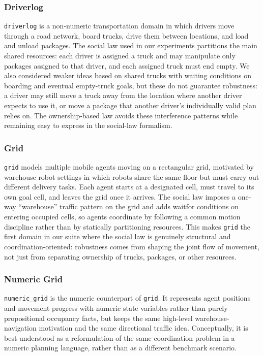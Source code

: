 \documentclass{article}
\theoremstyle{definition}
\begin{document}
\subsubsection{Driverlog}

\texttt{driverlog} is a non-numeric transportation domain in which drivers move through a road network, board trucks, drive them between locations, and load and unload packages. The social law used in our experiments partitions the main shared resources: each driver is assigned a truck and may manipulate only packages assigned to that driver, and each assigned truck must end empty. We also considered weaker ideas based on shared trucks with waiting conditions on boarding and eventual empty-truck goals, but these do not guarantee robustness: a driver may still move a truck away from the location where another driver expects to use it, or move a package that another driver's individually valid plan relies on. The ownership-based law avoids these interference patterns while remaining easy to express in the social-law formalism.

\subsubsection{Grid}

\texttt{grid} models multiple mobile agents moving on a rectangular grid, motivated by warehouse-robot settings in which robots share the same floor but must carry out different delivery tasks. Each agent starts at a designated cell, must travel to its own goal cell, and leaves the grid once it arrives. The social law imposes a one-way ``warehouse'' traffic pattern on the grid and adds waitfor conditions on entering occupied cells, so agents coordinate by following a common motion discipline rather than by statically partitioning resources. This makes \texttt{grid} the first domain in our suite where the social law is genuinely structural and coordination-oriented: robustness comes from shaping the joint flow of movement, not just from separating ownership of trucks, packages, or other resources.

\subsubsection{Numeric Grid}

\texttt{numeric\_grid} is the numeric counterpart of \texttt{grid}. It represents agent positions and movement progress with numeric state variables rather than purely propositional occupancy facts, but keeps the same high-level warehouse-navigation motivation and the same directional traffic idea. Conceptually, it is best understood as a reformulation of the same coordination problem in a numeric planning language, rather than as a different benchmark scenario.
\end{document}
